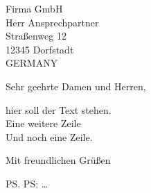 \documentclass[
  paper=a4,
  parskip=full,
  fromalign=right,
  fromphone=on,
  fromemail=on,
  fromurl=on,
  addrfield=on,
  backaddress=on,
  subject=beforeopening,
  foldmarks=on,
]{scrlttr2}
\begin{document}
\begin{letter}{Firma GmbH\\ Herr Ansprechpartner\\ Straßenweg 12\\12345 Dorfstadt\\GERMANY}

\opening{Sehr geehrte Damen und Herren,}
\begin{onehalfspace}
hier soll der Text stehen.\\
Eine weitere Zeile \\
Und noch eine Zeile.
\closing{Mit freundlichen Grüßen}

\ps PS: \dots
\end{onehalfspace}
\end{letter}
\end{document}
